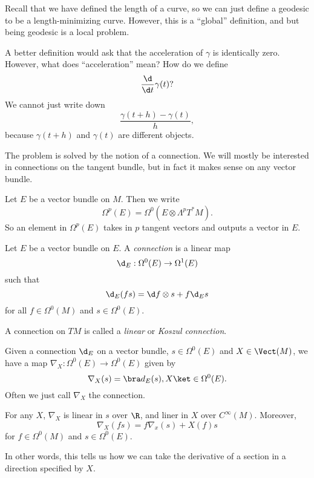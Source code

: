 \documentclass[a4paper]{article}
\begin{document}
Recall that we have defined the length of a curve, so we can just define a geodesic to be a length-minimizing curve. However, this is a ``global'' definition, and but being geodesic is a local problem.

A better definition would ask that the acceleration of $\gamma$ is identically zero. However, what does ``acceleration'' mean? How do we define
\[
  \frac{\d}{\d t} \gamma(t)?
\]
We cannot just write down
\[
  \frac{\gamma(t + h) - \gamma(t)}{h},
\]
because $\gamma(t + h)$ and $\gamma(t)$ are different objects.

The problem is solved by the notion of a connection. We will mostly be interested in connections on the tangent bundle, but in fact it makes sense on any vector bundle.

\begin{notation}
  Let $E$ be a vector bundle on $M$. Then we write
  \[
    \Omega^p(E) = \Omega^0(E \otimes \Lambda^p T^* M).
  \]
  So an element in $\Omega^p(E)$ takes in $p$ tangent vectors and outputs a vector in $E$.
\end{notation}

\begin{defi}[Connection]
  Let $E$ be a vector bundle on $E$. A \emph{connection} is a linear map
  \[
    \d_E: \Omega^0(E) \to \Omega^1(E)
  \]
  such that
  \[
    \d_E (fs) = \d f \otimes s + f \d_E s
  \]
  for all $f \in \Omega^0(M)$ and $s \in \Omega^0(E)$.

  A connection on $TM$ is called a \emph{linear} or \emph{Koszul connection}.
\end{defi}
Given a connection $\d_E$ on a vector bundle, $s \in \Omega^0(E)$ and $X \in \Vect(M)$, we have a map $\nabla_X: \Omega^0(E) \to \Omega^0(E)$ given by
\[
  \nabla_X(s) = \bra d_E(s), X \ket \in \Omega^0(E).
\]
Often we just call $\nabla_X$ the connection.

\begin{prop}
  For any $X$, $\nabla_X$ is linear in $s$ over $\R$, and liner in $X$ over $C^\infty(M)$. Moreover,
  \[
    \nabla_X(fs) = f \nabla_x(s) + X(f) s
  \]
  for $f \in \Omega^0(M)$ and $s \in \Omega^0(E)$.
\end{prop}
In other words, this tells us how we can take the derivative of a section in a direction specified by $X$.
\end{document}
